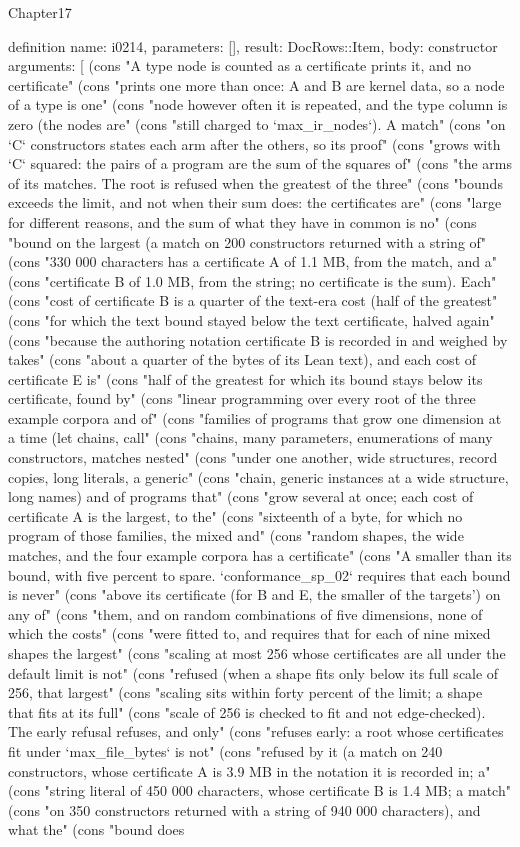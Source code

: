 \begin{lexlean}{Chapter17}
\begin{semanticmodule}
definition{
  name: i0214,
  parameters: [],
  result: DocRows::Item,
  body: constructor{
    arguments: [
      (cons "A type node is counted as a certificate prints it, and no certificate" (cons "prints one more than once: A and B are kernel data, so a node of a type is one" (cons "node however often it is repeated, and the type column is zero (the nodes are" (cons "still charged to `max_ir_nodes`). A match" (cons "on `C` constructors states each arm after the others, so its proof" (cons "grows with `C` squared: the pairs of a program are the sum of the squares of" (cons "the arms of its matches. The root is refused when the greatest of the three" (cons "bounds exceeds the limit, and not when their sum does: the certificates are" (cons "large for different reasons, and the sum of what they have in common is no" (cons "bound on the largest (a match on 200 constructors returned with a string of" (cons "330 000 characters has a certificate A of 1.1 MB, from the match, and a" (cons "certificate B of 1.0 MB, from the string; no certificate is the sum). Each" (cons "cost of certificate B is a quarter of the text-era cost (half of the greatest" (cons "for which the text bound stayed below the text certificate, halved again" (cons "because the authoring notation certificate B is recorded in and weighed by takes" (cons "about a quarter of the bytes of its Lean text), and each cost of certificate E is" (cons "half of the greatest for which its bound stays below its certificate, found by" (cons "linear programming over every root of the three example corpora and of" (cons "families of programs that grow one dimension at a time (let chains, call" (cons "chains, many parameters, enumerations of many constructors, matches nested" (cons "under one another, wide structures, record copies, long literals, a generic" (cons "chain, generic instances at a wide structure, long names) and of programs that" (cons "grow several at once; each cost of certificate A is the largest, to the" (cons "sixteenth of a byte, for which no program of those families, the mixed and" (cons "random shapes, the wide matches, and the four example corpora has a certificate" (cons "A smaller than its bound, with five percent to spare. `conformance_sp_02` requires that each bound is never" (cons "above its certificate (for B and E, the smaller of the targets') on any of" (cons "them, and on random combinations of five dimensions, none of which the costs" (cons "were fitted to, and requires that for each of nine mixed shapes the largest" (cons "scaling at most 256 whose certificates are all under the default limit is not" (cons "refused (when a shape fits only below its full scale of 256, that largest" (cons "scaling sits within forty percent of the limit; a shape that fits at its full" (cons "scale of 256 is checked to fit and not edge-checked). The early refusal refuses, and only" (cons "refuses early: a root whose certificates fit under `max_file_bytes` is not" (cons "refused by it (a match on 240 constructors, whose certificate A is 3.9 MB in the notation it is recorded in; a" (cons "string literal of 450 000 characters, whose certificate B is 1.4 MB; a match" (cons "on 350 constructors returned with a string of 940 000 characters), and what the" (cons "bound does }}
\end{semanticmodule}
\end{lexlean}
